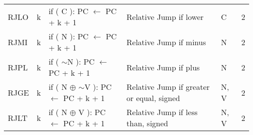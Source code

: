 \begin{footnotesize}
\begin{tabular}{|p{14.5mm}|p{14mm}|p{47mm}|p{46.5mm}|p{14mm}|p{10mm}|}
    RJLO     & k         & if ( C  ): PC $\leftarrow$ PC + k + 1                                  & Relative Jump if lower                    & C              & 2      \\
    RJMI     & k         & if ( N ): PC $\leftarrow$ PC + k + 1                                   & Relative Jump if minus                    & N              & 2      \\
    RJPL     & k         & if ( $\sim$N ): PC $\leftarrow$ PC + k + 1                             & Relative Jump if plus                     & N              & 2      \\
    RJGE     & k         & if ( N $\oplus$ $\sim$V ): \newline PC $\leftarrow$ PC + k + 1                         & Relative Jump \newline if greater or equal, signed& N, V           & 2      \\
    RJLT     & k         & if ( N $\oplus$ V ): \newline PC $\leftarrow$ PC + k + 1                               & Relative Jump \newline if less than, signed       & N, V           & 2      \\
    \hline
\end{tabular}

\end{footnotesize}
